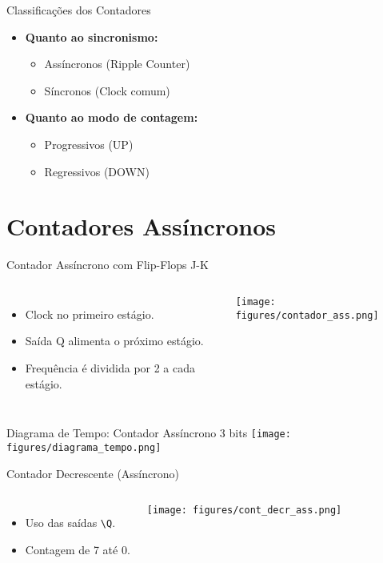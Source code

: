 \documentclass{beamer}
\begin{document}
\begin{frame}{Classificações dos Contadores}
\begin{itemize}
  \item \textbf{Quanto ao sincronismo:}
  \begin{itemize}
    \item Assíncronos (Ripple Counter)
    \item Síncronos (Clock comum)
  \end{itemize}
  \item \textbf{Quanto ao modo de contagem:}
  \begin{itemize}
    \item Progressivos (UP)
    \item Regressivos (DOWN)
  \end{itemize}
\end{itemize}
\end{frame}

\section{Contadores Assíncronos}

\begin{frame}{Contador Assíncrono com Flip-Flops J-K}
\begin{columns}
\begin{itemize}
  \item Clock no primeiro estágio.
  \item Saída Q alimenta o próximo estágio.
  \item Frequência é dividida por 2 a cada estágio.
\end{itemize}
\texttt{[image: figures/contador\_ass.png]}
\end{columns}
\end{frame}

\begin{frame}{Diagrama de Tempo: Contador Assíncrono 3 bits}
\centering
\texttt{[image: figures/diagrama\_tempo.png]}
\end{frame}

\begin{frame}{Contador Decrescente (Assíncrono)}
\begin{columns}
\begin{itemize}
  \item Uso das saídas \texttt{\textbackslash Q}.
  \item Contagem de 7 até 0.
\end{itemize}
\texttt{[image: figures/cont\_decr\_ass.png]}
\end{columns}
\end{frame}
\end{document}

